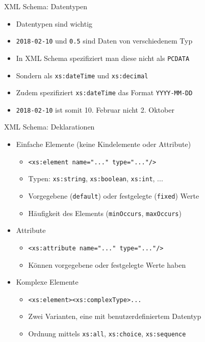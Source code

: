 \documentclass{beamer}
\begin{document}
\begin{frame}{XML Schema: Datentypen}
	
	\begin{itemize}
		\item Datentypen sind wichtig
		\item \texttt{2018-02-10} und \texttt{0.5} sind Daten von verschiedenem Typ
		\item In XML Schema spezifiziert man diese nicht als \texttt{PCDATA}
		\item Sondern als \texttt{xs:dateTime} und \texttt{xs:decimal}
		\item Zudem spezifiziert \texttt{xs:dateTime} das Format \texttt{YYYY-MM-DD}
		\item \texttt{2018-02-10} ist somit 10. Februar nicht 2. Oktober
	\end{itemize}
	
\end{frame}

\begin{frame}{XML Schema: Deklarationen}
	
	\begin{itemize}
		\item Einfache Elemente (keine Kindelemente oder Attribute)
		\begin{itemize}
			\item \texttt{<xs:element name="..." type="..."/>}
			\item Typen: \texttt{xs:string}, \texttt{xs:boolean}, \texttt{xs:int}, ...
			\item Vorgegebene (\texttt{default}) oder festgelegte (\texttt{fixed}) Werte
			\item Häufigkeit des Elements (\texttt{minOccurs}, \texttt{maxOccurs})
		\end{itemize}
		\item Attribute
		\begin{itemize}
			\item \texttt{<xs:attribute name="..." type="..."/>}
			\item Können vorgegebene oder festgelegte Werte haben
		\end{itemize}
		\item Komplexe Elemente
		\begin{itemize}
			\item \texttt{<xs:element><xs:complexType>...}
			\item Zwei Varianten, eine mit benutzerdefiniertem Datentyp
			\item Ordnung mittels \texttt{xs:all}, \texttt{xs:choice}, \texttt{xs:sequence}
		\end{itemize}
	\end{itemize}
	
\end{frame}
\end{document}
